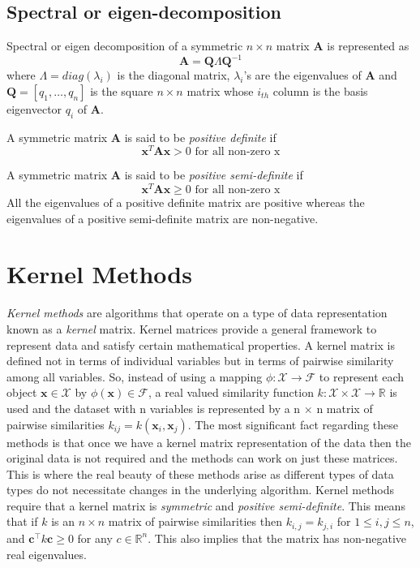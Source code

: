 \subsection{Spectral or eigen-decomposition}
Spectral or eigen decomposition of a symmetric $n \times n$ matrix $\mathbf{A}$ is represented as
\begin{displaymath}
    \mathbf{A} = \mathbf{Q} \Lambda \mathbf{Q}^{-1}  
\end{displaymath}
where $\Lambda = diag(\lambda_{i})$ is the diagonal matrix, $\lambda_{i}$'s are the eigenvalues of $\mathbf{A}$ and $\mathbf{Q}=[q_{1},\dots,q_{n}]$ is the square $n \times n$ matrix whose $i_{th}$ column is the basis eigenvector $q_{i}$ of $\mathbf{A}$.
  
A symmetric matrix $\mathbf{A}$ is said to be \textit{positive definite} if
\begin{displaymath}
    \mathbf{x}^{T}\mathbf{A}\mathbf{x} > 0 \mbox{ for all non-zero x}  
\end{displaymath}

A symmetric matrix $\mathbf{A}$ is said to be \textit{positive semi-definite} if
\begin{displaymath}
    \mathbf{x}^{T}\mathbf{A}\mathbf{x} \geq 0 \mbox{ for all non-zero x}  
\end{displaymath}
All the eigenvalues of a positive definite matrix are positive whereas the eigenvalues of a positive semi-definite matrix are non-negative.  

\section{Kernel Methods} \label{kern_methods}

\textit{Kernel methods} are algorithms that operate on a type of data representation known as a \textit{kernel} matrix. Kernel matrices provide a general framework to represent data and satisfy certain mathematical properties. A kernel matrix is defined not in terms of individual variables but in terms of pairwise similarity among all variables. So, instead of using a mapping $\phi:\mathcal{X}\rightarrow\mathcal{F}$ to represent each object $\mathbf{x}\in\mathcal{X}$ by $\phi(\mathbf{x})\in \mathcal{F}$, a real valued similarity function $k:\mathcal{X} \times\mathcal{X}\rightarrow\mathbb{R}$  is used and the dataset with n variables is represented by a n $\times$ n matrix of pairwise similarities $k_{ij}=k(\mathbf{x}_{i},\mathbf{x}_{j})$. The most significant fact regarding these methods is that once we have a kernel matrix representation of the data then the original data is not required and the methods can work on just these matrices. This is where the real beauty of these methods arise as different types of data types do not necessitate changes in the underlying algorithm. Kernel methods require that a kernel matrix is \textit{symmetric} and \textit{positive semi-definite}. This means that if $k$ is an $n \times n$ matrix of pairwise similarities then $k_{i,j}=k_{j,i}$ for $1 \leq i,j \leq n$, and $\mathbf{c}^\top k \mathbf{c} \geq 0$ for any $c \in \mathbb{R}^{n}$. This also implies that the matrix has non-negative real eigenvalues. 


